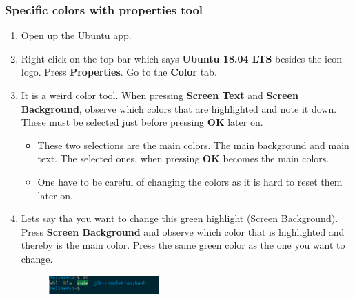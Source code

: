 \subsubsection{Specific colors with properties tool}\label{sec:color_properties_tool} \label{sec:colors_manually}

\begin{enumerate}
    \item Open up the Ubuntu app.
    \item Right-click on the top bar which says \textbf{Ubuntu 18.04 LTS} besides the icon logo. Press \textbf{Properties}. Go to the \textbf{Color} tab.
    \item It is a weird color tool. When pressing \textbf{Screen Text} and \textbf{Screen Background}, observe which colors that are highlighted and note it down. These must be selected just before pressing \textbf{OK} later on.
    \begin{itemize}
        \item These two selections are the main colors. The main background and main text. The selected ones, when pressing \textbf{OK} becomes the main colors.
        \item One have to be careful of changing the colors as it is hard to reset them later on.
    \end{itemize}
    \item Lets say tha you want to change this green highlight (Screen Background). Press \textbf{Screen Background} and observe which color that is highlighted and thereby is the main color. Press the same green color as the one you want to change.
    \begin{figure}[H]
        \centering
        \includegraphics[width = 0.4\textwidth]{Figures/WSL/color_example.PNG}
    \end{figure}
    

\end{enumerate}
